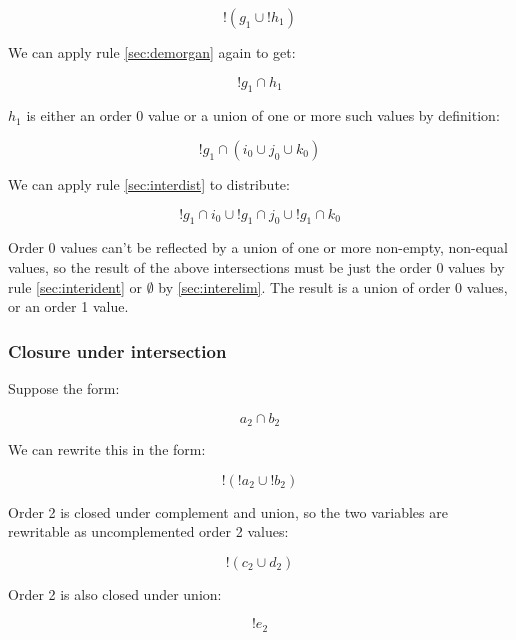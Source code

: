 \documentclass[letterpaper]{article}
\begin{document}
\begin{equation}
	! (g_1 \cup ! h_1)
\end{equation}

We can apply rule \ref{sec:demorgan} again to get:

\begin{equation}
	! g_1 \cap h_1
\end{equation}

\(h_1\) is either an order 0 value or a union of one or more such values by
definition:

\begin{equation}
	! g_1 \cap ( i_0 \cup j_0 \cup k_0 )
\end{equation}

We can apply rule \ref{sec:interdist} to distribute:

\begin{equation}
	!g_1 \cap i_0 \cup !g_1 \cap j_0 \cup !g_1 \cap k_0
\end{equation}

Order 0 values can't be reflected by a union of one or more non-empty,
non-equal values, so the result of the above intersections must be just the
order 0 values by rule \ref{sec:interident} or \(\emptyset\) by
\ref{sec:interelim}. The result is a union of order 0 values, or an order 1
value.

\subsubsection{Closure under intersection}

Suppose the form:

\begin{equation}
a_2 \cap b_2
\end{equation}

We can rewrite this in the form:

\begin{equation}
! ( !a_2 \cup !b_2 )
\end{equation}

Order 2 is closed under complement and union, so the two variables are
rewritable as uncomplemented order 2 values:

\begin{equation}
! ( c_2 \cup d_2 )
\end{equation}

Order 2 is also closed under union:

\begin{equation}
!e_2
\end{equation}
\end{document}
